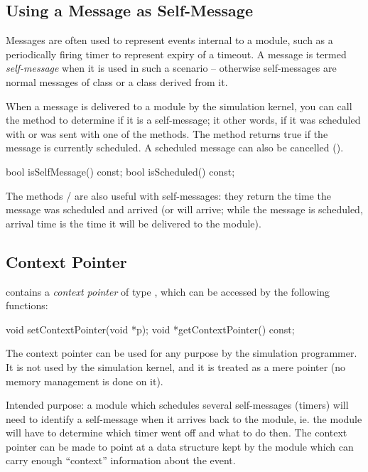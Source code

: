 \subsection{Using a Message as Self-Message}
\label{sec:messages:using-message-as-self-message}

Messages are often used to represent events internal to a module,
such as a periodically firing timer to represent expiry of a timeout.
A message is termed \textit{self-message} when it is used
in such a scenario -- otherwise self-messages are normal messages
of class  or a class derived from it.

When a message is delivered to a module by the simulation kernel,
you can call the  method to determine if it is
a self-message; it other words, if it was scheduled with
 or was sent with one of the
 methods. The  method
returns true if the message is currently scheduled. A scheduled
message can also be cancelled ().

\begin{cpp}
bool isSelfMessage() const;
bool isScheduled() const;
\end{cpp}

The methods  /  are also
useful with self-messages: they return the time the message was scheduled
and arrived (or will arrive; while the message is scheduled, arrival time
is the time it will be delivered to the module).


\subsection{Context Pointer}
\label{sec:messages:context-pointer}

 contains a \textit{context pointer} of type ,
which can be accessed by the following functions:

\begin{cpp}
void setContextPointer(void *p);
void *getContextPointer() const;
\end{cpp}

The context pointer can be used for any purpose by the simulation programmer.
It is not used by the simulation kernel, and it is treated as
a mere pointer (no memory management is done on it).

Intended purpose: a module which schedules several self-messages (timers)
will need to identify a self-message when it arrives back to the module,
ie. the module will have to determine which timer went off and what to do
then. The context pointer can be made to point at a data structure kept by
the module which can carry enough ``context'' information about the event.




